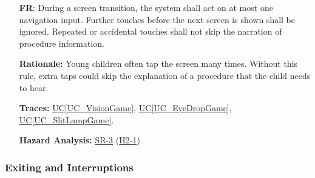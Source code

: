\documentclass[12pt]{article}
\newcommand{\ucref}[1]{\hyperref[#1]{UC\ref*{#1}}}
\newcounter{reqnum} %
\newcommand{\thmref}[1]{\hyperref[#1]{T\ref*{#1}}}
\newcommand{\haurl}{https://team-hindsight.github.io/ophthamology-game/HazardAnalysis/HazardAnalysis.pdf}
\newcommand{\hasrref}[2]{\href{\haurl\#nameddest=sr:#1}{SR-#2}}
\newcommand{\hahazref}[2]{\href{\haurl\#nameddest=haz:#1}{H#2}}
\newcommand{\hazsr}[4]{\hasrref{#1}{#2} (\hahazref{#3}{#4})}
\begin{document}
\begin{itemize}
\textbf{Rationale:} Penalties would make the game a new source of stress. Letting the child
skip an exercise lets them explore a procedure at their own pace. The reward
for finishing a level does not depend on the answers
(\thmref{thm_FirstFinish}).

\textbf{Traces:} \ucref{UC_VisionGame}, \ucref{UC_EyeDropGame},
\ucref{UC_SlitLampGame}, \thmref{thm_FirstFinish},
\thmref{thm_NoLoss}.

\textbf{Hazard Analysis:} \hazsr{NonPunitiveFeedback}{12}{PunitiveFeedback}{2-10}.

\item[\refstepcounter{reqnum}\textbf{FR\thereqnum}\label{FR_IgnoreRepeatedTouches}:]
During a screen transition, the system shall act on at most one
navigation input. Further touches before the next screen is shown shall be
ignored. Repeated or accidental touches shall not skip the narration of
procedure information.

\textbf{Rationale:} Young children often tap the screen many times. Without this rule, extra
taps could skip the explanation of a procedure that the child needs to
hear.

\textbf{Traces:} \ucref{UC_VisionGame}, \ucref{UC_EyeDropGame},
\ucref{UC_SlitLampGame}.

\textbf{Hazard Analysis:} \hazsr{PreventAccidentalInput}{3}{AccidentalInputSkipping}{2-1}.

\end{itemize}

\subsubsection{Exiting and Interruptions}
\label{sec_FRExit}
\end{document}

